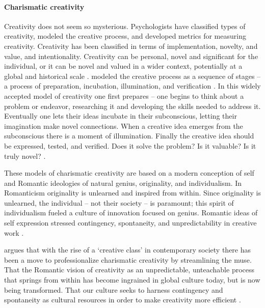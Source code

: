 \documentclass{article}
\begin{document}
\paragraph{Charismatic creativity}
Creativity does not seem so mysterious. %
%
Psychologists have classified types of creativity, modeled the creative process, 
and developed metrics for measuring creativity.
Creativity has been classified in terms of implementation, novelty, and value, and intentionality. 
Creativity can be personal, novel and significant for the individual, or it can be novel and valued in a wider context, potentially at a global and historical scale \citep{Drago2014}. 
%
\citeauthor{Wallas1926} modeled the creative process as a sequence of stages -- 
a process of preparation, incubation, illumination, and verification \citeyearpar{Wallas1926}. 
In this widely accepted model of creativity 
one first prepares -- 
one begins to think about a problem or endeavor, 
researching it and developing the skills needed to address it.
Eventually one lets their ideas incubate in their subconscious, 
letting their imagination make novel connections. 
When a creative idea emerges from the subconscious 
there is a moment of illumination.
Finally the creative idea should be expressed, tested, and verified.
Does it solve the problem? Is it valuable? Is it truly novel? \citep{Wallas1926, Drago2014}. 
%

These models of charismatic creativity are based on a modern conception of self
and Romantic ideologies of natural genius, originality, and individualism. 
In Romanticism originality is unlearned and inspired from within. 
%
Since originality is unlearned, 
the individual -- not their society -- is paramount; 
this spirit of individualism 
fueled a culture of innovation focused on genius. 
%
Romantic ideas of self expression stressed 
contingency, spontaneity, and unpredictability
in creative work \citep{Wilf2013a,Wilf2013b}. 
%

%
\citeauthor{Wilf2013b}
argues that with the rise of a `creative class' in contemporary society 
there has been a move to professionalize charismatic creativity by streamlining the muse. 
That the Romantic vision of creativity as an unpredictable, unteachable process that springs from within 
has become ingrained in global culture today, but is now being transformed. 
That our culture seeks to harness contingency and spontaneity as cultural resources 
in order to make creativity more efficient \citeyearpar{Wilf2013b}. 
%
\end{document}

